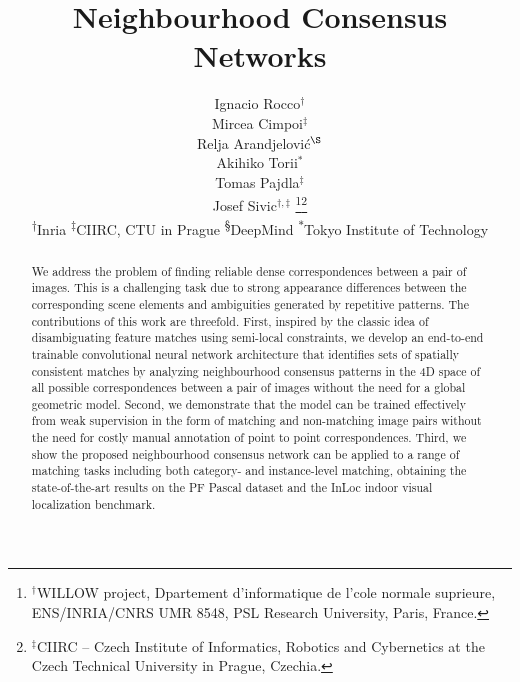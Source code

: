 \documentclass{article}
\begin{document}
\title{Neighbourhood Consensus Networks}

\author{
  Ignacio Rocco$^{\dagger}$ \\
  \And
  Mircea Cimpoi$^{\ddagger}$\\
  \And
  Relja Arandjelovi\'c$^{\S}$\\
  \And
  Akihiko Torii$^{\ast}$\\
  \And
  Tomas Pajdla$^{\ddagger}$\\
  \And
  Josef Sivic$^{\dagger,\ddagger}$
  \thanks{$^\dagger$WILLOW project, Dpartement d’informatique de l’cole normale suprieure,  ENS/INRIA/CNRS UMR 8548, PSL Research University, Paris, France.}\thanks{$^\ddagger$CIIRC -- Czech Institute of Informatics, Robotics and Cybernetics at the Czech Technical University in Prague, Czechia.}\\
  \AND
\normalfont
\normalsize\textsuperscript{$\dagger$}Inria\quad
\normalsize\textsuperscript{$\ddagger$}CIIRC, CTU in Prague\quad
\normalsize\textsuperscript{\S}DeepMind\quad
\normalsize\textsuperscript{$\ast$}Tokyo Institute of Technology
}
\maketitle


\begin{abstract}
We address the problem of finding reliable dense correspondences between a pair of images. This is a challenging task due to strong appearance differences between the corresponding scene elements and ambiguities generated by repetitive patterns. The contributions of this work are threefold. First, inspired by the classic idea of disambiguating feature matches using semi-local constraints,  we develop an end-to-end trainable convolutional neural network architecture that identifies sets of spatially consistent  matches by analyzing neighbourhood consensus patterns in the 4D space of all possible correspondences between a pair of images without the need for a global geometric model. Second, we demonstrate that the model can be trained effectively from weak supervision in the form of matching and non-matching image pairs without the need for costly manual annotation of point to point correspondences.
Third, we show the proposed neighbourhood consensus network can be applied to a range of matching tasks including both category- and instance-level matching, obtaining the state-of-the-art results on the PF Pascal dataset and the InLoc indoor visual localization benchmark.
\end{abstract}
\end{document}
